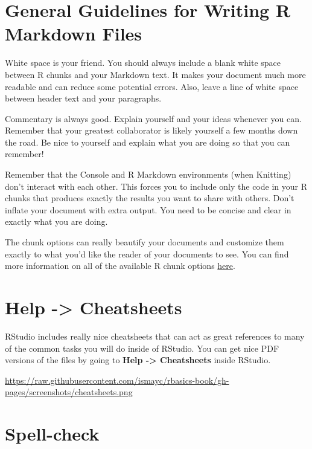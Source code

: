 \documentclass[]{tufte-book}
\begin{document}
\section{General Guidelines for Writing R Markdown
Files}\label{general-guidelines-for-writing-r-markdown-files}

White space is your friend. You should always include a blank white
space between R chunks and your Markdown text. It makes your document
much more readable and can reduce some potential errors. Also, leave a
line of white space between header text and your paragraphs.

Commentary is always good. Explain yourself and your ideas whenever you
can. Remember that your greatest collaborator is likely yourself a few
months down the road. Be nice to yourself and explain what you are doing
so that you can remember!

Remember that the Console and R Markdown environments (when Knitting)
don't interact with each other. This forces you to include only the code
in your R chunks that produces exactly the results you want to share
with others. Don't inflate your document with extra output. You need to
be concise and clear in exactly what you are doing.

The chunk options can really beautify your documents and customize them
exactly to what you'd like the reader of your documents to see. You can
find more information on all of the available R chunk options
\href{http://yihui.name/knitr/options/}{here}.

\section{Help -\textgreater{} Cheatsheets}\label{help---cheatsheets}

RStudio includes really nice cheatsheets that can act as great
references to many of the common tasks you will do inside of RStudio.
You can get nice PDF versions of the files by going to \textbf{Help
-\textgreater{} Cheatsheets} inside RStudio.

\vspace{0.1in}

\begin{center}\footnotesize{\url{https://raw.githubusercontent.com/ismayc/rbasics-book/gh-pages/screenshots/cheatsheets.png}}\end{center}

\vspace{0.1in}

\section{Spell-check}\label{spell-check}
\end{document}
